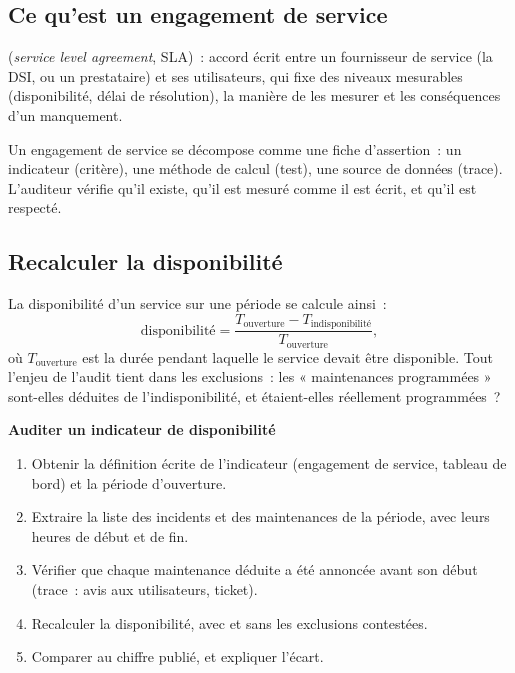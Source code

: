 \subsection{Ce qu'est un engagement de service}

\begin{boxdef}
(\textit{service level agreement}, SLA)~: accord écrit entre un
fournisseur de service (la DSI, ou un prestataire) et ses utilisateurs,
qui fixe des niveaux mesurables (disponibilité, délai de résolution), la
manière de les mesurer et les conséquences d'un manquement.
\end{boxdef}

Un engagement de service se décompose comme une fiche d'assertion~: un
indicateur (critère), une méthode de calcul (test), une source de données
(trace). L'auditeur vérifie qu'il existe, qu'il est mesuré comme il est
écrit, et qu'il est respecté.

\subsection{Recalculer la disponibilité}

La disponibilité d'un service sur une période se calcule ainsi~:
\[
    \text{disponibilité} = \frac{T_{\text{ouverture}} - T_{\text{indisponibilité}}}{T_{\text{ouverture}}},
\]
où $T_{\text{ouverture}}$ est la durée pendant laquelle le service devait
être disponible. Tout l'enjeu de l'audit tient dans les exclusions~: les
« maintenances programmées » sont-elles déduites de l'indisponibilité, et
étaient-elles réellement programmées~?

\begin{boxprocedure}
\textbf{Auditer un indicateur de disponibilité}
\begin{enumerate}
    \item Obtenir la définition écrite de l'indicateur (engagement de
          service, tableau de bord) et la période d'ouverture.
    \item Extraire la liste des incidents et des maintenances de la période,
          avec leurs heures de début et de fin.
    \item Vérifier que chaque maintenance déduite a été annoncée avant son
          début (trace~: avis aux utilisateurs, ticket).
    \item Recalculer la disponibilité, avec et sans les exclusions
          contestées.
    \item Comparer au chiffre publié, et expliquer l'écart.
\end{enumerate}
\end{boxprocedure}

